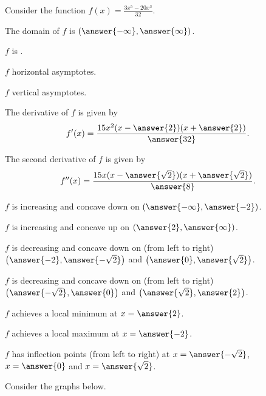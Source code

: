 \documentclass{ximera}
\author{Nela Lakos \and Kyle Parsons}
\begin{document}
\begin{exercise}

Consider the function $f(x) = \frac{3x^5-20x^3}{32}$.

The domain of $f$ is $\left(\answer{-\infty},\answer{\infty}\right)$.

$f$ is .

$f$  horizontal asymptotes.

$f$  vertical asymptotes.

The derivative of $f$ is given by
\[
f'(x) =\frac{15x^2(x- \answer{2})(x+ \answer{2})}{\answer{32}}.
\]

The second derivative of $f$ is given by 
\[
f''(x) =\frac{15x(x- \answer{\sqrt{2}})(x+ \answer{\sqrt{2}})}{ \answer{8}}.
\]

$f$ is increasing and concave down on $\left(\answer{-\infty},\answer{-2}\right)$.

$f$ is increasing and concave up on $\left(\answer{2},\answer{\infty}\right)$.

$f$ is decreasing and concave down on (from left to right) $\left(\answer{-2},\answer{-\sqrt{2}}\right)$ and $\left(\answer{0},\answer{\sqrt{2}}\right)$.

$f$ is decreasing and concave down on (from left to right) $\left(\answer{-\sqrt{2}},\answer{0}\right)$ and $\left(\answer{\sqrt{2}},\answer{2}\right)$.

$f$ achieves a local minimum at $x=\answer{2}$.

$f$ achieves a local maximum at $x=\answer{-2}$.

$f$ has inflection points (from left to right) at $x=\answer{-\sqrt{2}}$, $x=\answer{0}$ and $x=\answer{\sqrt{2}}$.

Consider the graphs below.

\end{exercise}
\end{document}
